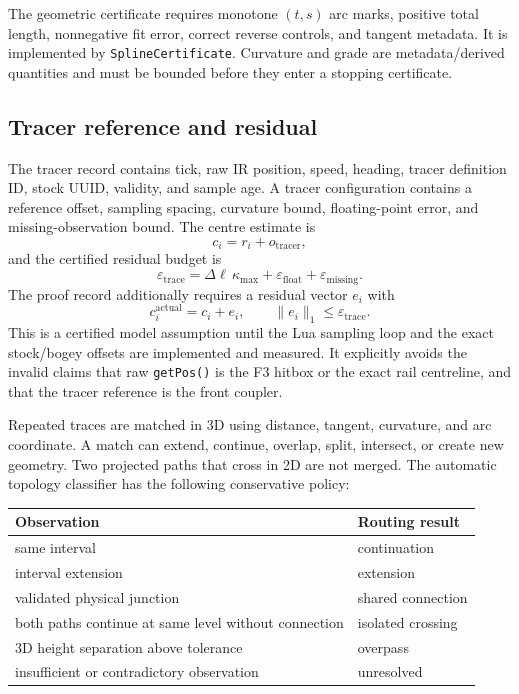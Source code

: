 \documentclass[10pt,a4paper]{article}
\newcommand{\Lean}[1]{\texttt{#1}}
\begin{document}
The geometric certificate requires monotone $(t,s)$ arc marks, positive total
length, nonnegative fit error, correct reverse controls, and tangent metadata.
It is implemented by \Lean{SplineCertificate}.  Curvature and grade are
metadata/derived quantities and must be bounded before they enter a stopping
certificate.

\subsection{Tracer reference and residual}

The tracer record contains tick, raw IR position, speed, heading, tracer
definition ID, stock UUID, validity, and sample age.  A tracer configuration
contains a reference offset, sampling spacing, curvature bound, floating-point
error, and missing-observation bound.  The centre estimate is
\[
  c_i = r_i + o_{\mathrm{tracer}},
\]
and the certified residual budget is
\[
  \varepsilon_{\mathrm{trace}}
  = \Delta\ell\,\kappa_{\max}
    +\varepsilon_{\mathrm{float}}
    +\varepsilon_{\mathrm{missing}}.
\]
The proof record additionally requires a residual vector $e_i$ with
\[
  c_i^{\mathrm{actual}}=c_i+e_i,
  \qquad \|e_i\|_1\leq\varepsilon_{\mathrm{trace}}.
\]
This is a certified model assumption until the Lua sampling loop and the exact
stock/bogey offsets are implemented and measured.  It explicitly avoids the
invalid claims that raw \texttt{getPos()} is the F3 hitbox or the exact rail
centreline, and that the tracer reference is the front coupler.

Repeated traces are matched in 3D using distance, tangent, curvature, and arc
coordinate.  A match can extend, continue, overlap, split, intersect, or
create new geometry.  Two projected paths that cross in 2D are not merged.
The automatic topology classifier has the following conservative policy:

\begin{center}
\begin{tabular}{ll}
\toprule
Observation & Routing result \\
\midrule
same interval & continuation \\
interval extension & extension \\
validated physical junction & shared connection \\
both paths continue at same level without connection & isolated crossing \\
3D height separation above tolerance & overpass \\
insufficient or contradictory observation & unresolved \\
\bottomrule
\end{tabular}
\end{center}
\end{document}
